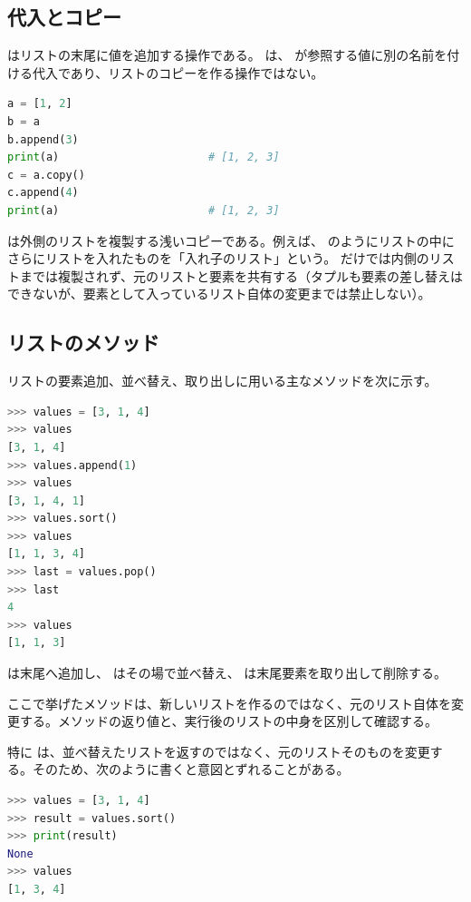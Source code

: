 \subsection{代入とコピー}
 はリストの末尾に値を追加する操作である。 は、 が参照する値に別の名前を付ける代入であり、リストのコピーを作る操作ではない。
\begin{lstlisting}[language=Python]
a = [1, 2]
b = a
b.append(3)
print(a)                       # [1, 2, 3]
c = a.copy()
c.append(4)
print(a)                       # [1, 2, 3]
\end{lstlisting}
 は外側のリストを複製する浅いコピーである。例えば、\code{[[1, 2], [3, 4]]} のようにリストの中にさらにリストを入れたものを「入れ子のリスト」という。 だけでは内側のリストまでは複製されず、元のリストと要素を共有する（タプルも要素の差し替えはできないが、要素として入っているリスト自体の変更までは禁止しない）。

\subsection{リストのメソッド}

リストの要素追加、並べ替え、取り出しに用いる主なメソッドを次に示す。

\begin{lstlisting}[language=Python, numbers=none, xleftmargin=2\zw]
>>> values = [3, 1, 4]
>>> values
[3, 1, 4]
>>> values.append(1)
>>> values
[3, 1, 4, 1]
>>> values.sort()
>>> values
[1, 1, 3, 4]
>>> last = values.pop()
>>> last
4
>>> values
[1, 1, 3]
\end{lstlisting}

 は末尾へ追加し、 はその場で並べ替え、 は末尾要素を取り出して削除する。

ここで挙げたメソッドは、新しいリストを作るのではなく、元のリスト自体を変更する。メソッドの返り値と、実行後のリストの中身を区別して確認する。

特に  は、並べ替えたリストを返すのではなく、元のリストそのものを変更する。そのため、次のように書くと意図とずれることがある。
\begin{lstlisting}[language=Python, numbers=none, xleftmargin=2\zw]
>>> values = [3, 1, 4]
>>> result = values.sort()
>>> print(result)
None
>>> values
[1, 3, 4]
\end{lstlisting}

